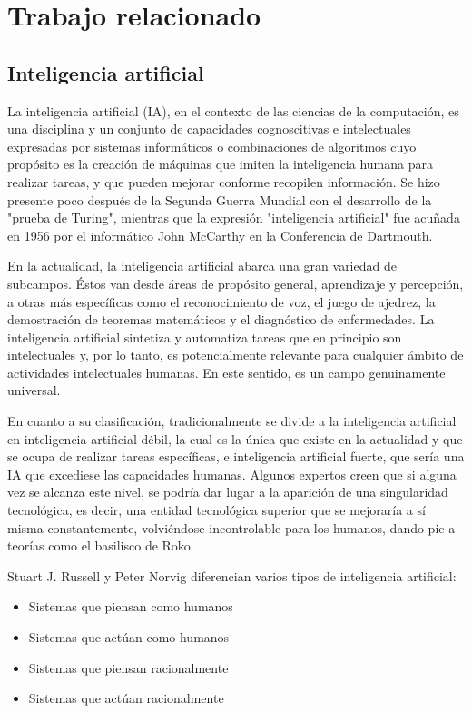 \chapter{Trabajo relacionado}

\section{Inteligencia artificial}

La inteligencia artificial (IA), en el contexto de las ciencias de la computación, es una disciplina y un conjunto de capacidades cognoscitivas e intelectuales expresadas por sistemas informáticos o combinaciones de algoritmos cuyo propósito es la creación de máquinas que imiten la inteligencia humana para realizar tareas, y que pueden mejorar conforme recopilen información\cite{espanola2014diccionario}. Se hizo presente poco después de la Segunda Guerra Mundial con el desarrollo de la "prueba de Turing", mientras que la expresión "inteligencia artificial" fue acuñada en 1956 por el informático John McCarthy en la Conferencia de Dartmouth.

En la actualidad, la inteligencia artificial abarca una gran variedad de subcampos. Éstos van desde áreas de propósito general, aprendizaje y percepción, a otras más específicas como el reconocimiento de voz, el juego de ajedrez, la demostración de teoremas matemáticos y el diagnóstico de enfermedades. La inteligencia artificial sintetiza y automatiza tareas que en principio son intelectuales y, por lo tanto, es potencialmente relevante para cualquier ámbito de actividades intelectuales humanas. En este sentido, es un campo genuinamente universal.

En cuanto a su clasificación, tradicionalmente se divide a la inteligencia artificial en inteligencia artificial débil, la cual es la única que existe en la actualidad y que se ocupa de realizar tareas específicas, e inteligencia artificial fuerte, que sería una IA que excediese las capacidades humanas. Algunos expertos creen que si alguna vez se alcanza este nivel, se podría dar lugar a la aparición de una singularidad tecnológica, es decir, una entidad tecnológica superior que se mejoraría a sí misma constantemente, volviéndose incontrolable para los humanos, dando pie a teorías como el basilisco de Roko.\cite{basilico}

Stuart J. Russell y Peter Norvig diferencian varios tipos de inteligencia artificial:

\begin{itemize}
\item Sistemas que piensan como humanos
\item Sistemas que actúan como humanos  
\item Sistemas que piensan racionalmente
\item Sistemas que actúan racionalmente
\end{itemize}

